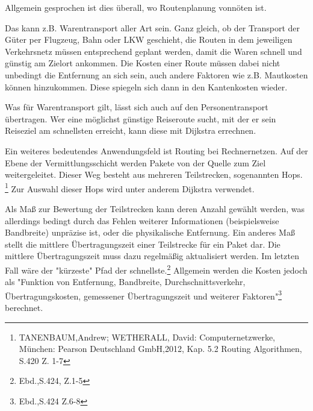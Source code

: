 \parindent0pt Allgemein gesprochen ist dies überall, wo Routenplanung vonnöten ist.

\parindent0pt
Das kann z.B. Warentransport aller Art sein. Ganz gleich, ob der Transport der Güter per Flugzeug, Bahn oder LKW geschieht, die Routen in dem jeweiligen Verkehrsnetz müssen entsprechend geplant werden, damit die Waren schnell und günstig am Zielort ankommen. Die Kosten einer Route müssen dabei nicht unbedingt die Entfernung an sich sein, auch andere Faktoren wie z.B. Mautkosten können hinzukommen. Diese spiegeln sich dann in den Kantenkosten wieder.

\parindent0pt Was für Warentransport gilt, lässt sich auch auf den Personentransport übertragen. Wer eine möglichst günstige Reiseroute sucht, mit der er sein Reiseziel am schnellsten erreicht, kann diese mit Dijkstra errechnen.

\parindent0pt Ein weiteres bedeutendes Anwendungsfeld ist Routing bei Rechnernetzen. Auf der Ebene der Vermittlungsschicht werden Pakete von der Quelle zum Ziel weitergeleitet. Dieser Weg besteht aus mehreren Teilstrecken, sogenannten Hops. \footnote{TANENBAUM,Andrew; WETHERALL, David: Computernetzwerke, München: Pearson Deutschland GmbH,2012, Kap. 5.2 Routing Algorithmen, S.420 Z. 1-7} Zur Auswahl dieser Hops wird unter anderem Dijkstra verwendet. 

\parindent0pt
Als Maß zur Bewertung der Teilstrecken kann deren Anzahl gewählt werden, was allerdings bedingt durch das Fehlen weiterer Informationen (beispielsweise Bandbreite) unpräzise ist, oder die physikalische Entfernung. Ein anderes Maß stellt die mittlere Übertragungszeit einer Teilstrecke für ein Paket dar. Die mittlere Übertragungszeit muss dazu regelmäßig aktualisiert werden. Im letzten Fall wäre der "kürzeste" Pfad der schnellste.\footnote{Ebd.,S.424, Z.1-5}
Allgemein werden die Kosten jedoch als "Funktion von Entfernung, Bandbreite, Durchschnittsverkehr, Übertragungskosten, gemessener Übertragungszeit und weiterer Faktoren"\footnote{Ebd.,S.424 Z.6-8} berechnet.
